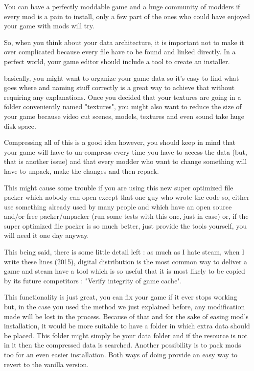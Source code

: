 \documentclass[a4paper,12pt]{article}
\begin{document}
You can have a perfectly moddable game and a huge community of modders if every mod is a pain to install, only a few part of the ones who could have enjoyed your game with mods will try.

So, when you think about your data architecture, it is important not to make it over complicated because every file have to be found and linked directly. In a perfect world, your game editor should include a tool to create an installer.

basically, you might want to organize your game data so it's easy to find what goes where and naming stuff correctly is a great way to achieve that without requiring any explanations. Once you decided that your textures are going in a folder conveniently named "textures", you might also want to reduce the size of your game because video cut scenes, models, textures and even sound take huge disk space.

Compressing all of this is a good idea however, you should keep in mind that your game will have to un-compress every time you have to access the data (but, that is another issue) and that every modder who want to change something will have to unpack, make the changes and then repack.

This might cause some trouble if you are using this new super optimized file packer which nobody can open except that one guy who wrote the code so, either use something already used by many people and which have an open source and/or free packer/unpacker (run some tests with this one, just in case) or, if the super optimized file packer is so much better, just provide the tools yourself, you will need it one day anyway.

This being said, there is some little detail left : as much as I hate steam, when I write these lines (2015), digital distribution is the most common way to deliver a game and steam have a tool which is so useful that it is most likely to be copied by its future competitors : "Verify integrity of game cache".

This functionality is just great, you can fix your game if it ever stops working but, in the case you used the method we just explained before, any modification made will be lost in the process. Because of that and for the sake of easing mod's installation, it would be more suitable to have a folder in which extra data should be placed. This folder might simply be your data folder and if the resource is not in it then the compressed data is searched. Another possibility is to pack mods too for an even easier installation. Both ways of doing provide an easy way to revert to the vanilla version.
\end{document}
